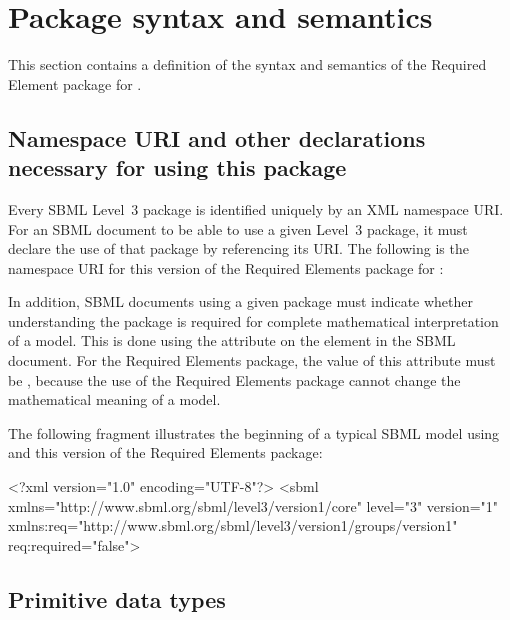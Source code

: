 
\section{Package syntax and semantics}
\label{syntax}

This section contains a definition of the syntax and semantics of the Required Element package for \sbmlthreecore.  

\subsection{Namespace URI and other declarations necessary for using this package}
\label{xml-namespace}

Every SBML Level~3 package is identified uniquely by an XML namespace URI.  For an SBML document to be able to use a given Level~3 package, it must declare the use of that package by referencing its URI.  The following is the namespace URI for this version of the Required Elements package for \sbmlthreecore:
\begin{center}
\end{center}

In addition, SBML documents using a given package must indicate whether understanding the package is required for complete mathematical interpretation of a model.  This is done using the attribute  on the  element in the SBML document.  For the Required Elements package, the value of this attribute must be , because the use of the Required Elements package cannot change the mathematical meaning of a model.

The following fragment illustrates the beginning of a typical SBML model using \sbmlthreecore and this version of the Required Elements package:

\begin{example}
<?xml version="1.0" encoding="UTF-8"?>
<sbml xmlns="http://www.sbml.org/sbml/level3/version1/core" level="3" version="1"
      xmlns:req="http://www.sbml.org/sbml/level3/version1/groups/version1" req:required="false">
\end{example}


\subsection{Primitive data types}
\label{new-primitive-types}

